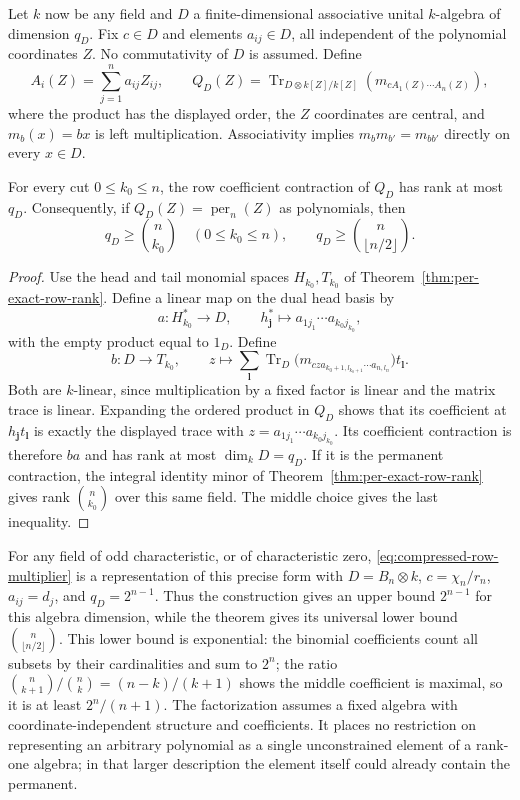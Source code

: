 Let $k$ now be any field and $D$ a finite-dimensional associative
unital $k$-algebra of dimension $q_D$. Fix $c\in D$ and elements
$a_{ij}\in D$, all independent of the polynomial coordinates $Z$.
No commutativity of $D$ is assumed. Define
\[
 A_i(Z)=\sum_{j=1}^n a_{ij}Z_{ij},\qquad
 Q_D(Z)=\operatorname{Tr}_{D\otimes k[Z]/k[Z]}
                 (m_{c A_1(Z)\cdots A_n(Z)}),
\]
where the product has the displayed order, the $Z$ coordinates are
central, and $m_b(x)=bx$ is left multiplication. Associativity
implies $m_bm_{b'}=m_{bb'}$ directly on every $x\in D$.

\begin{theorem}\label{thm:compressed-fixed-algebra-bound}
For every cut $0\le k_0\le n$, the row coefficient contraction
of $Q_D$ has rank at most $q_D$. Consequently, if
$Q_D(Z)=\operatorname{per}_n(Z)$ as polynomials, then
\[
 q_D\ge\binom n{k_0}\quad(0\le k_0\le n),\qquad
 q_D\ge\binom n{\lfloor n/2\rfloor}.
\]
\end{theorem}
\begin{proof}
Use the head and tail monomial spaces $H_{k_0},T_{k_0}$ of
Theorem~\ref{thm:per-exact-row-rank}. Define a linear map on
the dual head basis by
\[
 a:H_{k_0}^*\longrightarrow D,\qquad
 h_{\boldsymbol j}^*\longmapsto
 a_{1j_1}\cdots a_{k_0j_{k_0}},
\]
with the empty product equal to $1_D$. Define
\[
 b:D\longrightarrow T_{k_0},\qquad
 z\longmapsto\sum_{\boldsymbol l}
 \operatorname{Tr}_D\bigl(m_{c z
      a_{k_0+1,l_{k_0+1}}\cdots a_{n,l_n}}\bigr)
 t_{\boldsymbol l}.
\]
Both are $k$-linear, since multiplication by a fixed factor is
linear and the matrix trace is linear. Expanding the ordered product
in $Q_D$ shows that its coefficient at
$h_{\boldsymbol j}t_{\boldsymbol l}$ is exactly the displayed
trace with $z=a_{1j_1}\cdots a_{k_0j_{k_0}}$. Its coefficient
contraction is therefore $ba$ and has rank at most $\dim_kD=q_D$.
If it is the permanent contraction, the integral identity minor
of Theorem~\ref{thm:per-exact-row-rank} gives rank $\binom n{k_0}$
over this same field. The middle choice gives the last inequality.
\end{proof}

For any field of odd characteristic, or of characteristic zero,
\eqref{eq:compressed-row-multiplier} is a representation of this
precise form with $D=B_n\otimes k$, $c=\chi_n/r_n$,
$a_{ij}=d_j$, and $q_D=2^{n-1}$. Thus the construction gives an
upper bound $2^{n-1}$ for this algebra dimension, while the theorem
gives its universal lower bound $\binom n{\lfloor n/2\rfloor}$.
This lower bound is exponential: the binomial coefficients count
all subsets by their cardinalities and sum to $2^n$; the ratio
$\binom n{k+1}/\binom nk=(n-k)/(k+1)$ shows the middle coefficient
is maximal, so it is at least $2^n/(n+1)$.
The factorization assumes a fixed algebra with coordinate-independent
structure and coefficients. It places no restriction on representing
an arbitrary polynomial as a single unconstrained element of a
rank-one algebra; in that larger description the element itself
could already contain the permanent.

